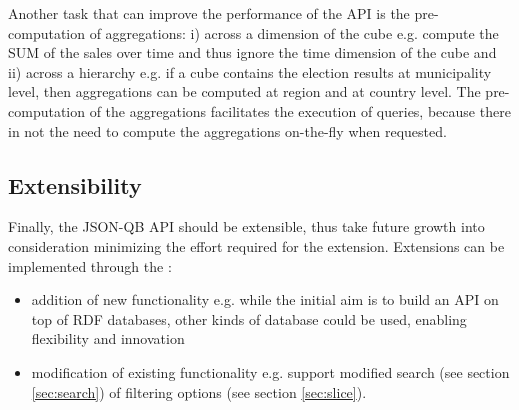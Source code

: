 \documentclass{llncs}
\begin{document}
Another task that can improve the performance of the API is the pre-computation of aggregations: i) across a dimension of the cube e.g. compute the SUM of the sales over time and thus ignore the time dimension of the cube and ii) across a hierarchy e.g. if a cube contains the election results at municipality level, then aggregations can be computed at region and at country level. The pre-computation of the aggregations facilitates the execution of queries, because there in not the need to compute the aggregations on-the-fly when requested. 



\subsection{Extensibility}

Finally, the JSON-QB API should be extensible, thus take future growth into consideration minimizing the effort required for the extension. Extensions can be implemented through the :
\begin{itemize}
\item addition of new functionality e.g. while the initial aim is to build an API on top of RDF databases, other kinds of database could be used, enabling flexibility and innovation
\item modification of existing functionality e.g. support modified search (see section \ref{sec:search}) of filtering options (see section \ref{sec:slice}).
\end{itemize} 
\end{document}
